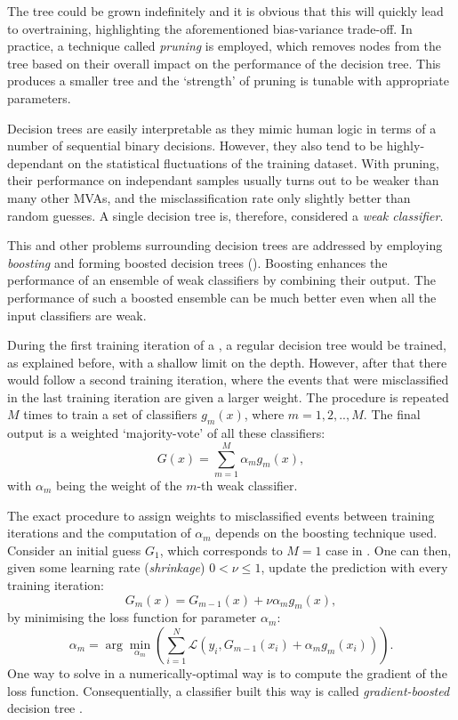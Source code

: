 The tree could be grown indefinitely and it is obvious that this will quickly lead to overtraining, highlighting the aforementioned bias-variance trade-off.
In practice, a technique called \textit{pruning} is employed, which removes nodes from the tree based on their overall impact on the performance of the decision tree.
This produces a smaller tree and the `strength' of pruning is tunable with appropriate parameters.

Decision trees are easily interpretable as they mimic human logic in terms of a number of sequential binary decisions.
However, they also tend to be highly-dependant on the statistical fluctuations of the training dataset.
With pruning, their performance on independant samples usually turns out to be weaker than many other MVAs, and the misclassification rate only slightly better than random guesses.
A single decision tree is, therefore, considered a \textit{weak classifier}.

This and other problems surrounding decision trees are addressed by employing \textit{boosting} and forming boosted decision trees ().
Boosting enhances the performance of an ensemble of weak classifiers by combining their output. 
The performance of such a boosted ensemble can be much better even when all the input classifiers are weak.

During the first training iteration of a \BDT, a regular decision tree would be trained, as explained before, with a shallow limit on the depth.
However, after that there would follow a second training iteration, where the events that were misclassified in the last training iteration are given a larger weight.
The procedure is repeated $M$ times to train a set of classifiers $g_{m}(x)$, where $m=1,2,..,M$.
The final output is a weighted `majority-vote' of all these classifiers:
\begin{equation}\label{eq:boosted_classifier}
    G(x) = \sum_{m=1}^M\alpha_mg_m(x),
\end{equation}
with $\alpha_m$ being the weight of the $m$-th weak classifier.

The exact procedure to assign weights to misclassified events between training iterations and the computation of $\alpha_m$ depends on the boosting technique used.
Consider an initial guess $G_1$, which corresponds to $M=1$ case in .
One can then, given some learning rate (\textit{shrinkage}) $0<\nu\leq1$, update the prediction with every training iteration:
\begin{equation}
    G_m(x) = G_{m-1}(x) + \nu\alpha_mg_m(x),
\end{equation}
by minimising the loss function for parameter $\alpha_m$: 
\begin{equation}\label{eq:minimize_loss}
    \alpha_m = \arg\min_{\alpha_m}\left(\sum_{i=1}^N\mathcal{L}(y_i, G_{m-1}(x_i) + \alpha_mg_m(x_i))\right).
\end{equation}
One way to solve  in a numerically-optimal way is to compute the gradient of the loss function.
Consequentially, a classifier built this way is called \textit{gradient-boosted} decision tree \cite{FRIEDMAN1013203451}.

